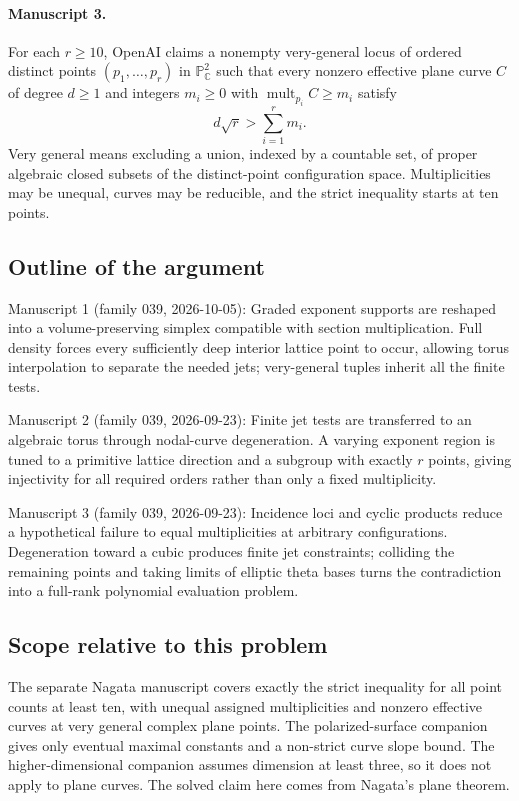 \documentclass[11pt]{article}
\begin{document}
\paragraph{Manuscript 3.}
For each $r\ge10$, OpenAI claims a nonempty very-general locus of ordered distinct points $(p_1,\ldots,p_r)$ in $\mathbb P^2_{\mathbb C}$ such that every nonzero effective plane curve $C$ of degree $d\ge1$ and integers $m_i\ge0$ with $\operatorname{mult}_{p_i}C\ge m_i$ satisfy
\[
d\sqrt r>\sum_{i=1}^r m_i.
\]
Very general means excluding a union, indexed by a countable set, of proper algebraic closed subsets of the distinct-point configuration space. Multiplicities may be unequal, curves may be reducible, and the strict inequality starts at ten points.

\subsection{Outline of the argument}
Manuscript 1 (family 039, 2026-10-05): Graded exponent supports are reshaped into a volume-preserving simplex compatible with section multiplication. Full density forces every sufficiently deep interior lattice point to occur, allowing torus interpolation to separate the needed jets; very-general tuples inherit all the finite tests.

Manuscript 2 (family 039, 2026-09-23): Finite jet tests are transferred to an algebraic torus through nodal-curve degeneration. A varying exponent region is tuned to a primitive lattice direction and a subgroup with exactly $r$ points, giving injectivity for all required orders rather than only a fixed multiplicity.

Manuscript 3 (family 039, 2026-09-23): Incidence loci and cyclic products reduce a hypothetical failure to equal multiplicities at arbitrary configurations. Degeneration toward a cubic produces finite jet constraints; colliding the remaining points and taking limits of elliptic theta bases turns the contradiction into a full-rank polynomial evaluation problem.

\subsection{Scope relative to this problem}
The separate Nagata manuscript covers exactly the strict inequality for all point counts at least ten, with unequal assigned multiplicities and nonzero effective curves at very general complex plane points. The polarized-surface companion gives only eventual maximal constants and a non-strict curve slope bound. The higher-dimensional companion assumes dimension at least three, so it does not apply to plane curves. The solved claim here comes from Nagata's plane theorem.
\end{document}
